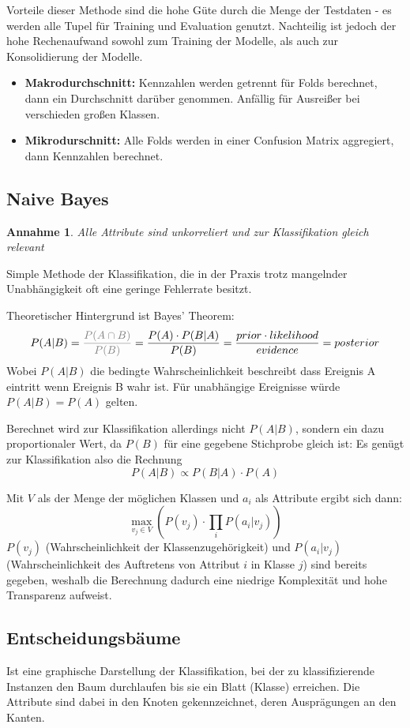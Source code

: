 \documentclass{article}
\newtheorem{assumption}{Annahme}
\begin{document}
Vorteile dieser Methode sind die hohe Güte durch die Menge der Testdaten - 
es werden alle Tupel für Training und Evaluation genutzt.
Nachteilig ist jedoch der hohe Rechenaufwand sowohl zum Training der Modelle,
als auch zur Konsolidierung der Modelle.

\begin{itemize}
    \item \textbf{Makrodurchschnitt:} Kennzahlen werden getrennt für Folds berechnet, 
    dann ein Durchschnitt darüber genommen. Anfällig für Ausreißer bei verschieden großen Klassen.
    \item \textbf{Mikrodurschnitt:} Alle Folds werden in einer Confusion Matrix aggregiert, dann Kennzahlen berechnet.
\end{itemize}


\subsection{Naive Bayes}
\begin{assumption}
Alle Attribute sind unkorreliert und zur Klassifikation gleich relevant
\end{assumption}

Simple Methode der Klassifikation, die in der Praxis trotz mangelnder Unabhängigkeit oft eine geringe Fehlerrate besitzt.

Theoretischer Hintergrund ist Bayes' Theorem:
\[ P(A | B) 
= \textcolor{gray}{\frac{P(A \cap B)}{P(B)}}
= \frac{P(A)\cdot P(B | A) }{P(B)} 
= \frac{prior \cdot likelihood}{evidence}
= posterior\]
Wobei $P(A | B)$ die bedingte Wahrscheinlichkeit beschreibt dass Ereignis A eintritt wenn Ereignis B wahr ist.
Für unabhängige Ereignisse würde $P(A|B) = P(A)$ gelten.


Berechnet wird zur Klassifikation allerdings nicht $P(A|B)$, sondern ein dazu proportionaler Wert, da $P(B)$ für eine gegebene Stichprobe gleich ist:
Es genügt zur Klassifikation also die Rechnung 
\[ P(A|B)\propto P(B|A) \cdot P(A) \]

Mit $V$ als der Menge der möglichen Klassen und $a_{i}$ als Attribute ergibt sich dann: 
\[ \max_{v_{j}\in V}( P(v_{j}) \cdot \prod_{i} P(a_{i}| v_{j}) ) \]
$P(v_{j})$ (Wahrscheinlichkeit der Klassenzugehörigkeit) und $P(a_{i}|v_{j})$ (Wahrscheinlichkeit des Auftretens von Attribut $i$ in Klasse $j$) sind bereits gegeben,
weshalb die Berechnung dadurch eine niedrige Komplexität und hohe Transparenz aufweist.

\subsection{Entscheidungsbäume}
Ist eine graphische Darstellung der Klassifikation, bei der zu klassifizierende Instanzen den Baum durchlaufen
bis sie ein Blatt (Klasse) erreichen. Die Attribute sind dabei in den Knoten gekennzeichnet, deren Ausprägungen an den Kanten.
\end{document}
